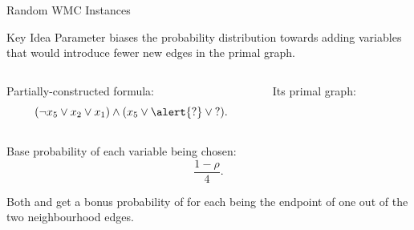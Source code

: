 \documentclass{beamer}
\begin{document}
\begin{frame}{Random WMC Instances}
  \begin{block}{Key Idea}
    Parameter \structure{$\rho \in [0, 1]$} biases the probability distribution
    towards adding variables that would introduce fewer new edges in the primal
    graph.
  \end{block}
  \begin{example}
    \begin{columns}
      \begin{column}{0.65\linewidth}
        Partially-constructed formula:
        \[
          (\neg x_{5} \lor x_{2} \lor x_{1}) \land (x_{5} \lor \alert{\mathord{?}} \lor \mathord{?}).
        \]
      \end{column}
      \begin{column}{0.25\linewidth}
        Its primal graph:

      \end{column}
    \end{columns}

    Base probability of each variable being chosen:
    \[
      \frac{1 - \rho}{4}.
    \]

    Both  and  get a bonus probability of
     for each being the endpoint of \alert{one} out of
    the \alert{two} neighbourhood edges.
  \end{example}
\end{frame}
\end{document}
